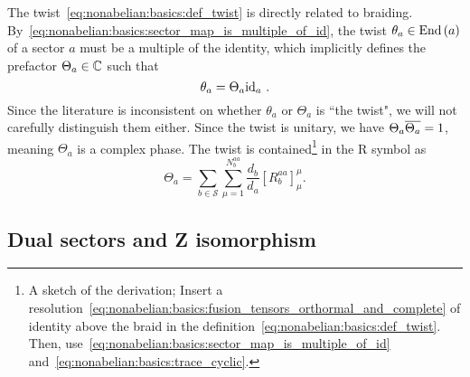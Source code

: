 The twist~\eqref{eq:nonabelian:basics:def_twist} is directly related to braiding.
%
By~\eqref{eq:nonabelian:basics:sector_map_is_multiple_of_id}, the twist $\theta_a \in \mathrm{End}\left(a\right)$ of a sector $a$ must be a multiple of the identity, which implicitly defines the prefactor $\Theta_a \in \mathbb{C}$ such that
\begin{equation}
    \label{eq:nonabelian:topo_data:def_twist_prefactor}
    \theta_a = \Theta_a \mathrm{id}_{a}
    ~.
\end{equation}
%
Since the literature is inconsistent on whether $\theta_a$ or $\Theta_a$ is ``the twist", we will not carefully distinguish them either.
%
Since the twist is unitary, we have $\Theta_a \overline{\Theta_a} = 1$, meaning $\Theta_a$ is a complex phase.
%
The twist is contained\footnote{
    A sketch of the derivation; Insert a resolution~\eqref{eq:nonabelian:basics:fusion_tensors_orthormal_and_complete} of identity above the braid in the definition~\eqref{eq:nonabelian:basics:def_twist}. Then, use~\eqref{eq:nonabelian:basics:sector_map_is_multiple_of_id} and~\eqref{eq:nonabelian:basics:trace_cyclic}.
} in the R symbol as
\begin{equation}
    \label{eq:nonabelian:topo_data:twist_from_R}
    \Theta_a = \sum_{b\in\mathcal{S}} \sum_{\mu=1}^{N^{aa}_b} \frac{d_b}{d_a} [R^{aa}_b]^\mu_\mu
    .
\end{equation}


\subsection{Dual sectors and Z isomorphism}
\label{subsec:nonabelian:topo_data:dual_sectors}

